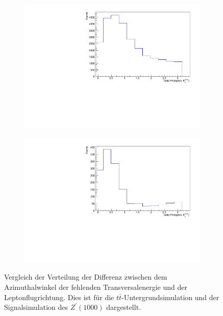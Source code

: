 \begin{figure}[H]
  \begin{subfigure}{0.5\textwidth}
    \centering
    \includegraphics[width=\linewidth]{plots_and_txt/ttbar.mu_selected_/ttbar.mu_selected_DeltaPhi.pdf}
    \caption{}
    \label{fig:ttbar_sys1}
  \end{subfigure}%
  \begin{subfigure}{0.5\textwidth}
    \centering
    \includegraphics[width=\linewidth]{plots_and_txt/zprime1000.mu_selected_/zprime1000.mu_selected_DeltaPhi.pdf}
    \caption{}
    \label{fig:zprime_sys1}
  \end{subfigure}%
  \caption{Vergleich der Verteilung der Differenz zwischen dem Azimuthalwinkel der fehlenden Transversalenergie und der Leptonflugrichtung.
  Dies ist für die $t\bar{t}$-Untergrundsimulation  und der Signalsimulation des $Z^\prime(1000)$  dargestellt.
  }
  \label{fig:Comparison1}
\end{figure}

